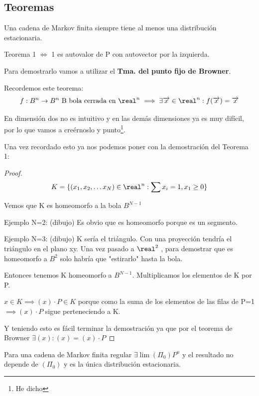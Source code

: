 \subsection{Teoremas}
\begin{theorem}[Teorema 1]
	\label{Markov_tma1}
	Una cadena de Markov finita siempre tiene al menos una distribución estacionaria.
\end{theorem}

	\obs Teorema 1 $\iff$ 1 es autovalor de P con autovector por la izquierda.


	Para demostrarlo vamos a utilizar el \textbf{Tma. del punto fijo de Browner}.


	Recordemos este teorema:
	$$f: B^n \rightarrow B^n  \text{  B bola cerrada en }\real^n \implies \exists \overrightarrow x \in \real^n : f(\overrightarrow x ) = \overrightarrow x$$

	En dimensión dos no es intuitivo y en las demás dimensiones ya es muy difícil, por lo que vamos a creérnoslo y punto\footnote{He dicho}.

	Una vez recordado esto ya nos podemos poner con la demostración del Teorema 1:
	\begin{proof}
	$$K = \{(x_1 , x_2, \ldots x_N) \in \real^n : \sum x_i = 1 , x_1 \geq 0\}$$

	Vemos que K es homeomorfo a la bola $B^{N-1}$

	Ejemplo N=2:
	(dibujo)
	Es obvio que es homeomorfo porque es un segmento.

	Ejemplo N=3:
	(dibujo)
	K sería el triángulo. Con una proyección tendría el triángulo en el plano xy.
	Una vez pasado a $\real^2$ , para demostrar que es homeomorfo a $B^2$ solo habría que "estirarlo" hasta la bola.

	Entonces tenemos K homeomorfo a $B^{N-1}$. Multiplicamos los elementos de K por P.

	$x \in K \implies (x)\cdot P \in K$ porque como la suma de los elementos de las filas de P=1 $\implies (x)\cdot P$ sigue perteneciendo a K.

	Y teniendo esto es fácil terminar la demostración ya que por el teorema de Browner $\exists (x) : (x) = (x)\cdot P$
\end{proof}
\newpage
\begin{theorem}[Teorema 2]
	\label{Markov_tma2}
	Para una cadena de Markov finita regular $\exists \lim (\Pi_0) P^n$ y el resultado no depende de $(\Pi_0)$ y es la única distribución estacionaria.
\end{theorem}

